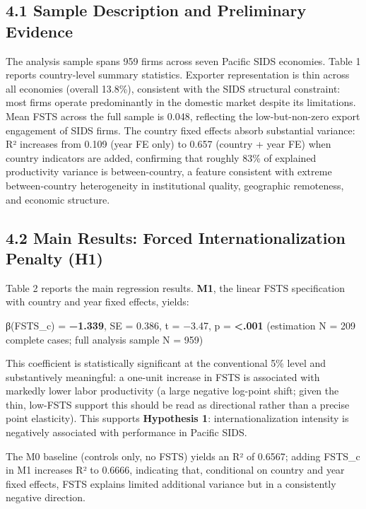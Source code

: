 \documentclass[
  12pt]{article}
\begin{document}
\hypertarget{sample-description-and-preliminary-evidence}{%
\subsection{4.1 Sample Description and Preliminary
Evidence}\label{sample-description-and-preliminary-evidence}}

The analysis sample spans 959 firms across seven Pacific SIDS economies.
Table 1 reports country-level summary statistics. Exporter
representation is thin across all economies (overall 13.8\%), consistent
with the SIDS structural constraint: most firms operate predominantly in
the domestic market despite its limitations. Mean FSTS across the full
sample is 0.048, reflecting the low-but-non-zero export engagement of
SIDS firms. The country fixed effects absorb substantial variance: R²
increases from 0.109 (year FE only) to 0.657 (country + year FE) when
country indicators are added, confirming that roughly 83\% of explained
productivity variance is between-country, a feature consistent with
extreme between-country heterogeneity in institutional quality,
geographic remoteness, and economic structure.

\hypertarget{main-results-forced-internationalization-penalty-h1}{%
\subsection{4.2 Main Results: Forced Internationalization Penalty
(H1)}\label{main-results-forced-internationalization-penalty-h1}}

Table 2 reports the main regression results. \textbf{M1}, the linear
FSTS specification with country and year fixed effects, yields:

β(FSTS\_c) = \textbf{−1.339}, SE = 0.386, t = −3.47, p =
\textbf{\textless.001} (estimation N = 209 complete cases; full analysis
sample N = 959)

This coefficient is statistically significant at the conventional 5\%
level and substantively meaningful: a one-unit increase in FSTS is
associated with markedly lower labor productivity (a large negative
log-point shift; given the thin, low-FSTS support this should be read as
directional rather than a precise point elasticity). This supports
\textbf{Hypothesis 1}: internationalization intensity is negatively
associated with performance in Pacific SIDS.

The M0 baseline (controls only, no FSTS) yields an R² of 0.6567; adding
FSTS\_c in M1 increases R² to 0.6666, indicating that, conditional on
country and year fixed effects, FSTS explains limited additional
variance but in a consistently negative direction.
\end{document}
